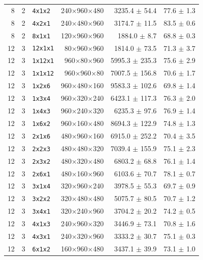 \begin{longtable}{rrlrrr}
8 & 2 & \texttt{4x1x2} & 240$\times$960$\times$480 & 3235.4 $\pm$ 54.4 & 77.6 $\pm$ 1.3 \\
8 & 2 & \texttt{4x2x1} & 240$\times$480$\times$960 & 3174.7 $\pm$ 11.5 & 83.5 $\pm$ 0.6 \\
8 & 2 & \texttt{8x1x1} & 120$\times$960$\times$960 & 1884.0 $\pm$ 8.7 & 68.8 $\pm$ 0.3 \\
12 & 3 & \texttt{12x1x1} & 80$\times$960$\times$960 & 1814.0 $\pm$ 73.5 & 71.3 $\pm$ 3.7 \\
12 & 3 & \texttt{1x12x1} & 960$\times$80$\times$960 & 5995.3 $\pm$ 235.3 & 75.6 $\pm$ 2.9 \\
12 & 3 & \texttt{1x1x12} & 960$\times$960$\times$80 & 7007.5 $\pm$ 156.8 & 70.6 $\pm$ 1.7 \\
12 & 3 & \texttt{1x2x6} & 960$\times$480$\times$160 & 9583.3 $\pm$ 102.6 & 69.8 $\pm$ 1.4 \\
12 & 3 & \texttt{1x3x4} & 960$\times$320$\times$240 & 6423.1 $\pm$ 117.3 & 76.3 $\pm$ 2.0 \\
12 & 3 & \texttt{1x4x3} & 960$\times$240$\times$320 & 6235.3 $\pm$ 97.6 & 76.9 $\pm$ 1.4 \\
12 & 3 & \texttt{1x6x2} & 960$\times$160$\times$480 & 8694.3 $\pm$ 122.9 & 74.8 $\pm$ 1.3 \\
12 & 3 & \texttt{2x1x6} & 480$\times$960$\times$160 & 6915.0 $\pm$ 252.2 & 70.4 $\pm$ 3.5 \\
12 & 3 & \texttt{2x2x3} & 480$\times$480$\times$320 & 7039.4 $\pm$ 155.9 & 75.1 $\pm$ 2.3 \\
12 & 3 & \texttt{2x3x2} & 480$\times$320$\times$480 & 6803.2 $\pm$ 68.8 & 76.1 $\pm$ 1.4 \\
12 & 3 & \texttt{2x6x1} & 480$\times$160$\times$960 & 6103.6 $\pm$ 70.7 & 78.1 $\pm$ 0.7 \\
12 & 3 & \texttt{3x1x4} & 320$\times$960$\times$240 & 3978.5 $\pm$ 55.3 & 69.7 $\pm$ 0.9 \\
12 & 3 & \texttt{3x2x2} & 320$\times$480$\times$480 & 5075.7 $\pm$ 80.5 & 70.7 $\pm$ 1.2 \\
12 & 3 & \texttt{3x4x1} & 320$\times$240$\times$960 & 3704.2 $\pm$ 20.2 & 74.2 $\pm$ 0.5 \\
12 & 3 & \texttt{4x1x3} & 240$\times$960$\times$320 & 3446.9 $\pm$ 73.1 & 70.8 $\pm$ 1.6 \\
12 & 3 & \texttt{4x3x1} & 240$\times$320$\times$960 & 3333.2 $\pm$ 30.7 & 75.1 $\pm$ 0.3 \\
12 & 3 & \texttt{6x1x2} & 160$\times$960$\times$480 & 3437.1 $\pm$ 39.9 & 73.1 $\pm$ 1.0 \\

\end{longtable}
